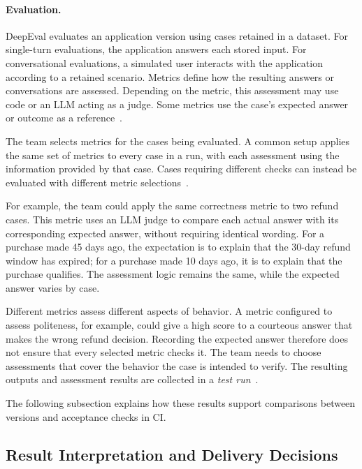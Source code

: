 \paragraph{Evaluation.}
DeepEval evaluates an application version using cases retained in a dataset.
For single-turn evaluations, the application answers each stored input. For
conversational evaluations, a simulated user interacts with the application
according to a retained scenario. Metrics define how the resulting answers
or conversations are assessed. Depending on the metric, this assessment may
use code or an LLM acting as a judge. Some metrics use the case's expected
answer or outcome as a reference~\parencite{DeepEval:AgentGuide,DeepEval:MultiTurn}.

The team selects metrics for the cases being evaluated. A common setup applies
the same set of metrics to every case in a run, with each assessment using the
information provided by that case. Cases requiring different checks can
instead be evaluated with different metric
selections~\parencite{DeepEval:AgentGuide,DeepEval:CI}.

For example, the team could apply the same correctness metric to two refund
cases. This metric uses an LLM judge to compare each actual answer with its
corresponding expected answer, without requiring identical wording. For a
purchase made 45 days ago, the expectation is to explain that the 30-day refund
window has expired; for a purchase made 10 days ago, it is to explain that the
purchase qualifies. The assessment logic remains the same, while the expected
answer varies by case.

Different metrics assess different aspects of behavior.
A metric configured to assess politeness, for example, could give a high score
to a courteous answer that makes the wrong refund decision. Recording the
expected answer therefore does not ensure that every selected metric checks
it. The team needs to choose assessments that cover the behavior the case is
intended to verify. The resulting outputs and assessment results are collected
in a \emph{test run}~\parencite{DeepEval:AgentGuide,DeepEval:MultiTurn}.

The following subsection explains how these results support comparisons
between versions and acceptance checks in CI.

\subsection{Result Interpretation and Delivery Decisions}

